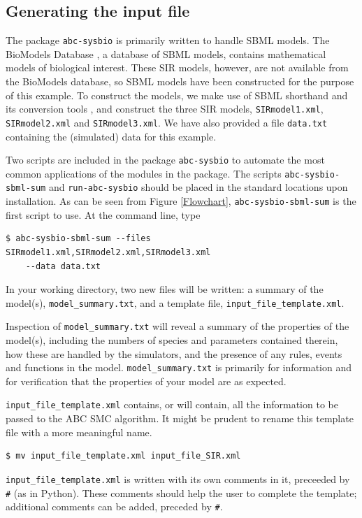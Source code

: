 \documentclass[a4paper]{report}
\begin{document}
\subsection{Generating the input file}
The package \verb$abc-sysbio$ is primarily written to handle SBML models. The BioModels Database \citep{LeNovere2006}, a database of SBML models, contains mathematical models of biological interest. These SIR models, however, are not available from the BioModels database, so SBML models have been constructed for the purpose of this example. To construct the models, we make use of SBML shorthand and its conversion tools \citep{Gillespie2006}, and construct the three SIR models, \verb$SIRmodel1.xml$, \verb$SIRmodel2.xml$ and \verb$SIRmodel3.xml$. We have also provided a file \verb$data.txt$ containing the (simulated) data for this example.

Two scripts are included in the package \verb$abc-sysbio$ to automate the most common applications of the modules in the package. The scripts \verb$abc-sysbio-sbml-sum$ and \verb$run-abc-sysbio$ should be placed in the standard locations upon installation. As can be seen from Figure \ref{Flowchart}, \verb$abc-sysbio-sbml-sum$ is the first script to use. At the command line, type
\begin{verbatim}
$ abc-sysbio-sbml-sum --files SIRmodel1.xml,SIRmodel2.xml,SIRmodel3.xml
	--data data.txt
\end{verbatim}
In your working directory, two new files will be written: a summary of the model(s), \verb$model_summary.txt$, and a template file, \verb$input_file_template.xml$. 

Inspection of \verb$model_summary.txt$ will reveal a summary of the properties of the model(s), including the numbers of species and parameters contained therein, how these are handled by the simulators, and the presence of any rules, events and functions in the model. \verb$model_summary.txt$ is primarily for information and for verification that the properties of your model are as expected. 

\verb$input_file_template.xml$ contains, or will contain, all the information to be passed to the ABC SMC algorithm. It might be prudent to rename this template file with a more meaningful name.
\begin{verbatim}
$ mv input_file_template.xml input_file_SIR.xml
\end{verbatim}
\verb$input_file_template.xml$ is written with its own comments in it, preceeded by \verb$#$ (as in Python). These comments should help the user to complete the template; additional comments can be added, preceded by \verb$#$.
\end{document}
